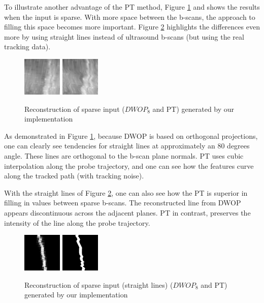 		To illustrate another advantage of the PT method, Figure \ref{fig:sparse} and shows the results when the input is sparse. With more space between the b-scans, the approach to filling this space becomes more important. Figure \ref{fig:sparse_lines} highlights the differences even more by using straight lines instead of ultrasound b-scans (but using the real tracking data).
		
		\begin{figure}[h]
			\centering
			\includegraphics[height=0.2\textheight]{graphics/dwop8_sparse.png}
			\includegraphics[height=0.2\textheight]{graphics/pt_sparse.png}
			\caption[Reconstructed sparse input]{Reconstruction of sparse input ($DWOP_8$ and PT) generated by our implementation}
			\label{fig:sparse}
		\end{figure}
		
		As demonstrated in Figure \ref{fig:sparse}, because DWOP is based on orthogonal projections, one can clearly see tendencies for straight lines at approximately an 80 degrees angle. These lines are orthogonal to the b-scan plane normals. PT uses cubic interpolation along the probe trajectory, and one can see how the features curve along the tracked path (with tracking noise).
		
		With the straight lines of Figure \ref{fig:sparse_lines}, one can also see how the PT is superior in filling in values between sparse b-scans. The reconstructed line from DWOP appears discontinuous across the adjacent planes. PT in contrast, preserves the intensity of the line along the probe trajectory.
		
		\begin{figure}[h]
			\centering
			\includegraphics[height=0.2\textheight]{graphics/dwop8_sparse_lines.png}
			\includegraphics[height=0.2\textheight]{graphics/pt_sparse_lines.png}
			\caption[Reconstructed sparse input (straight lines)]{Reconstruction of sparse input (straight lines) ($DWOP_8$ and PT) generated by our implementation}
			\label{fig:sparse_lines}
		\end{figure}

